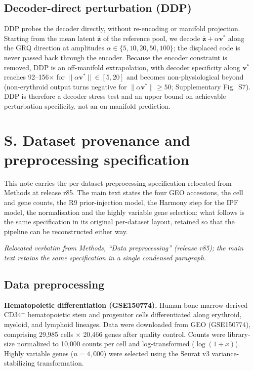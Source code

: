 \documentclass[11 pt,a4 paper]{article}
\begin{document}
\subsection*{Decoder-direct perturbation (DDP)}

DDP probes the decoder directly, without re-encoding or manifold projection. Starting from the mean latent $\bar{\mathbf{z}}$ of the reference pool, we decode $\bar{\mathbf{z}} + \alpha\mathbf{v}^*$ along the GRQ direction at amplitudes $\alpha \in \{5, 10, 20, 50, 100\}$; the displaced code is never passed back through the encoder. Because the encoder constraint is removed, DDP is an off-manifold extrapolation, with decoder specificity along $\mathbf{v}^*$ reaches 92--156$\times$ for $\|\alpha\mathbf{v}^*\|\in[5,20]$ and becomes non-physiological beyond (non-erythroid output turns negative for $\|\alpha\mathbf{v}^*\|\ge50$; Supplementary Fig.~S7). DDP is therefore a decoder stress test and an upper bound on achievable perturbation specificity, not an on-manifold prediction.

\clearpage

\section*{S. Dataset provenance and preprocessing specification}

This note carries the per-dataset preprocessing specification relocated from Methods at release r85. The main text states the four GEO accessions, the cell and gene counts, the R9 prior-injection model, the Harmony step for the IPF model, the normalisation and the highly variable gene selection; what follows is the same specification in its original per-dataset layout, retained so that the pipeline can be reconstructed either way.

\noindent\emph{Relocated verbatim from Methods, ``Data preprocessing'' (release r85); the main text retains the same specification in a single condensed paragraph.}

\subsection*{Data preprocessing}

\textbf{Hematopoietic differentiation (GSE150774).} Human bone marrow-derived CD34$^+$ hematopoietic stem and progenitor cells differentiated along erythroid, myeloid, and lymphoid lineages. Data were downloaded from GEO (GSE150774), comprising 29,985 cells $\times$ 20,466 genes after quality control. Counts were library-size normalized to 10,000 counts per cell and log-transformed ($\log(1+x)$). Highly variable genes ($n=4,000$) were selected using the Seurat v3 variance-stabilizing transformation.
\end{document}
